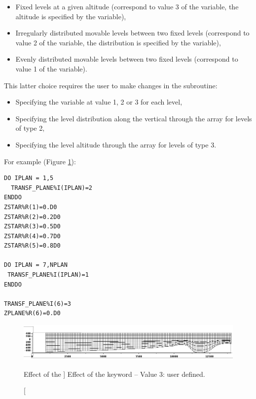 \begin{itemize}
\item Fixed levels at a given altitude (correspond to value 3 of the
 variable, the altitude is specified by the
 variable),

\item Irregularly distributed movable levels between two fixed levels
(correspond to value 2 of the  variable,
the distribution is specified by the  variable),

\item Evenly distributed movable levels between two fixed levels (correspond
to value 1 of the  variable).
\end{itemize}

This latter choice requires the user to make changes in the
 subroutine:

\begin{itemize}
\item Specifying the variable  at value 1, 2 or 3
for each level,

\item Specifying the level distribution along the vertical through the array
 for levels of type 2,

\item Specifying the level altitude through the array 
for levels of type 3.
\end{itemize}

For example (Figure \ref{fig:mesh_transf3}):
\begin{lstlisting}[language=TelFortran]
DO IPLAN = 1,5
  TRANSF_PLANE%I(IPLAN)=2
ENDDO
ZSTAR%R(1)=0.D0
ZSTAR%R(2)=0.2D0
ZSTAR%R(3)=0.5D0
ZSTAR%R(4)=0.7D0
ZSTAR%R(5)=0.8D0

DO IPLAN = 7,NPLAN
 TRANSF_PLANE%I(IPLAN)=1
ENDDO

TRANSF_PLANE%I(6)=3
ZPLANE%R(6)=0.D0
\end{lstlisting}

\begin{figure}[H]%
\begin{center}
%
  \includegraphics[width=\textwidth]{./graphics/mesh_transformation3}
%
\end{center}
\caption
[Effect of the ]
{Effect of the  keyword -- Value 3: user defined.}
\label{fig:mesh_transf3}
\end{figure}

